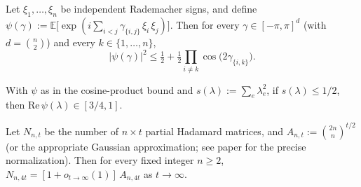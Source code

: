 \begin{lemma}
\label{fact:psi-sq}
Let $\xi_1, \dots, \xi_n$ be independent Rademacher signs, and define
$\psi(\gamma) := \mathbb{E}\bigl[\exp(i \sum_{i<j} \gamma_{\{i,j\}}\,\xi_i\,\xi_j)\bigr]$.
Then for every $\gamma \in [-\pi,\pi]^d$ (with $d=\binom{n}{2}$) and every
$k \in \{1, \dots, n\}$,
\[
  |\psi(\gamma)|^2 \le \tfrac12 + \tfrac12 \prod_{i\ne k}\cos\bigl(2\gamma_{\{i,k\}}\bigr).
\]
\end{lemma}

\begin{lemma}
\label{lem:realpart}
With $\psi$ as in the cosine-product bound and
$s(\lambda) := \sum_{e}\lambda_e^2$, if $s(\lambda) \le 1/2$, then
$\mathrm{Re}\,\psi(\lambda) \in [3/4, 1]$.
\end{lemma}

\begin{lemma}
\label{fact:fixed-n}
Let $N_{n,t}$ be the number of $n \times t$ partial Hadamard matrices, and
$A_{n,t} := \binom{2n}{n}^{t/2}$ (or the appropriate Gaussian
approximation; see paper for the precise normalization). Then for every
fixed integer $n \ge 2$, $N_{n,4t} = [1 + o_{t\to\infty}(1)]\,A_{n,4t}$
as $t \to \infty$.
\end{lemma}
